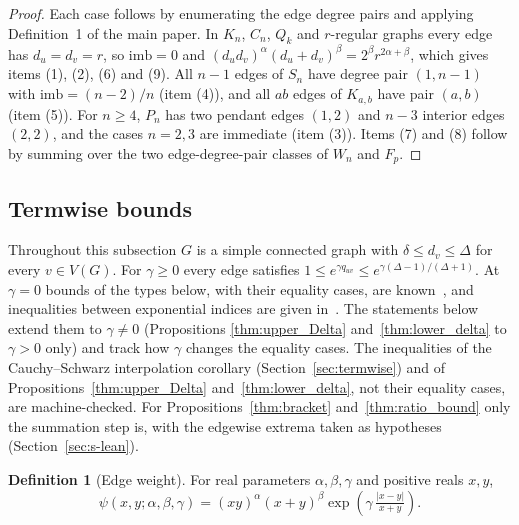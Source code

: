 \documentclass[a5paper, 10pt]{article}
\theoremstyle{plain}
\theoremstyle{remark}
\theoremstyle{definition}
\newtheorem{definition}{Definition}
\newcommand{\edgepsi}{\psi(x,y;\alpha,\beta,\gamma)}
\begin{document}
  \begin{proof}
  Each case follows by enumerating the edge degree pairs and applying
  Definition~1 of the main paper. In $K_n$, $C_n$, $Q_k$ and $r$-regular
  graphs every edge has $d_u = d_v = r$, so $\mathrm{imb} = 0$ and
  $(d_u d_v)^{\alpha}(d_u + d_v)^{\beta} = 2^{\beta} r^{2\alpha + \beta}$,
  which gives items (1), (2), (6) and (9). All $n - 1$ edges of $S_n$
  have degree pair $(1, n - 1)$ with $\mathrm{imb} = (n - 2)/n$
  (item (4)), and all $ab$ edges of $K_{a,b}$ have pair $(a, b)$ (item (5)).
  For $n \ge 4$, $P_n$ has two pendant edges $(1, 2)$ and $n - 3$ interior
  edges $(2, 2)$, and the cases $n = 2, 3$ are immediate (item (3)).
  Items (7) and (8) follow by summing over the two edge-degree-pair
  classes of $W_n$ and $F_p$.
  \end{proof}

\subsection*{Termwise bounds}\label{sec:termwise}
  Throughout this subsection $G$ is a simple connected graph with
  $\delta \le d_v \le \Delta$ for every $v \in V(G)$. For $\gamma \ge 0$
  every edge satisfies
  $1 \le e^{\gamma q_{uv}} \le e^{\gamma(\Delta-1)/(\Delta+1)}$. At
  $\gamma = 0$ bounds of the types below, with their equality cases, are
  known~\cite{MolinaSigarreta2025GM, GranadosJMC2025GM, PortillaJMC2025GM}, and inequalities between exponential indices are given in~\cite{CarballosaQuintanaRodriguezSigarreta2023}.
  The statements below extend them to $\gamma \ne 0$ (Propositions
  \ref{thm:upper_Delta} and~\ref{thm:lower_delta} to $\gamma > 0$ only)
  and track how $\gamma$ changes the equality cases. The inequalities
  of the Cauchy--Schwarz interpolation corollary
  (Section~\ref{sec:termwise}) and of Propositions~\ref{thm:upper_Delta} and~\ref{thm:lower_delta}, not
  their equality cases, are machine-checked. For
  Propositions~\ref{thm:bracket} and~\ref{thm:ratio_bound} only the
  summation step is, with the edgewise extrema taken as hypotheses
  (Section~\ref{sec:s-lean}).

  \begin{definition}[Edge weight]\label{def:psi}
  For real parameters $\alpha, \beta, \gamma$ and positive reals
  $x, y$,
  \begin{equation}\label{eq:psi}
  \edgepsi = (xy)^{\alpha}(x + y)^{\beta}
  \exp\!\left(\gamma\,\tfrac{|x - y|}{x + y}\right).
  \end{equation}
  \end{definition}
\end{document}
